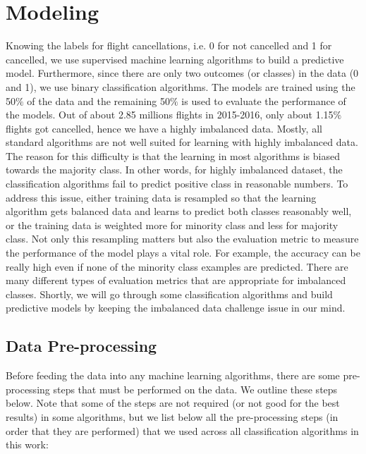 \documentclass[12pt]{article}
\begin{document}
\section{Modeling}
\label{sec:models}
Knowing the labels for flight cancellations, i.e. 0 for not cancelled and 1 for cancelled, we use supervised machine learning algorithms to build a predictive model. Furthermore, since there are only two outcomes (or classes) in the data (0 and 1), we use binary classification algorithms. The models are trained using the 50$\%$ of the data and the remaining 50$\%$ is used to evaluate the performance of the models. Out of about 2.85 millions flights in 2015-2016, only about 1.15$\%$ flights got cancelled, hence we have a highly imbalanced data. Mostly, all standard algorithms are not well suited for learning with highly imbalanced data. The reason for this difficulty is that the learning in most algorithms is biased towards the majority class. In other words, for highly imbalanced dataset, the classification algorithms fail to predict positive class in reasonable numbers. To address this issue, either training data is resampled so that the learning algorithm gets balanced data and learns to predict both classes reasonably well, or the training data is weighted more for minority class and less for majority class. Not only this resampling matters but also the evaluation metric to measure the performance of the model plays a vital role. For example, the accuracy can be really high even if none of the minority class examples are predicted. There are many different types of evaluation metrics that are appropriate for imbalanced classes. Shortly, we will go through some classification algorithms and build predictive models by keeping the imbalanced data challenge issue in our mind. 
\subsection{Data Pre-processing}
\label{sec:preproc}
Before feeding the data into any machine learning algorithms, there are some pre-processing steps that must be performed on the data. We outline these steps below. Note that some of the steps are not required (or not good for the best results) in some algorithms, but we list below all the pre-processing steps (in order that they are performed) that we used across all classification algorithms in this work:
\end{document}
